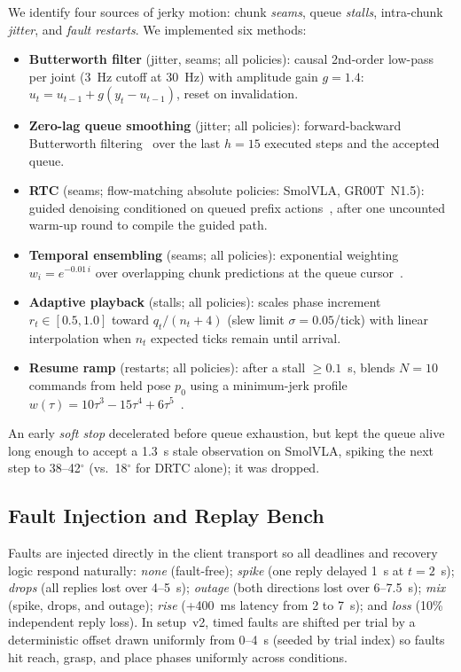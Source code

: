 \documentclass[conference]{IEEEtran}
\newcommand{\drtc}{DRTC}
\newcommand{\smolvla}{SmolVLA}
\newcommand{\groot}{GR00T~N1.5}
\begin{document}
We identify four sources of jerky motion: chunk \emph{seams}, queue \emph{stalls}, intra-chunk \emph{jitter}, and \emph{fault restarts}. We implemented six methods:
\begin{itemize}
  \item \textbf{Butterworth filter} (jitter, seams; all policies): causal 2nd-order low-pass per joint (3~Hz cutoff at 30~Hz) with amplitude gain $g=1.4$: $u_t = u_{t-1} + g(y_t - u_{t-1})$, reset on invalidation.
  \item \textbf{Zero-lag queue smoothing} (jitter; all policies): forward-backward Butterworth filtering~\cite{gustafsson1996} over the last $h=15$ executed steps and the accepted queue.
  \item \textbf{RTC} (seams; flow-matching absolute policies: \smolvla{}, \groot{}): guided denoising conditioned on queued prefix actions~\cite{black2025rtc}, after one uncounted warm-up round to compile the guided path.
  \item \textbf{Temporal ensembling} (seams; all policies): exponential weighting $w_i = e^{-0.01\,i}$ over overlapping chunk predictions at the queue cursor~\cite{zhao2023act}.
  \item \textbf{Adaptive playback} (stalls; all policies): scales phase increment $r_t \in [0.5,1.0]$ toward $q_t/(n_t+4)$ (slew limit $\sigma=0.05$/tick) with linear interpolation when $n_t$ expected ticks remain until arrival.
  \item \textbf{Resume ramp} (restarts; all policies): after a stall $\ge 0.1$~s, blends $N=10$ commands from held pose $p_0$ using a minimum-jerk profile $w(\tau)=10\tau^3-15\tau^4+6\tau^5$~\cite{flash1985}.
\end{itemize}
An early \emph{soft stop} decelerated before queue exhaustion, but kept the queue alive long enough to accept a 1.3~s stale observation on \smolvla{}, spiking the next step to 38--42$^\circ$ (vs.\ 18$^\circ$ for \drtc{} alone); it was dropped.

\subsection{Fault Injection and Replay Bench}

Faults are injected directly in the client transport so all deadlines and recovery logic respond naturally: \emph{none} (fault-free); \emph{spike} (one reply delayed 1~s at $t=2$~s); \emph{drops} (all replies lost over 4--5~s); \emph{outage} (both directions lost over 6--7.5~s); \emph{mix} (spike, drops, and outage); \emph{rise} (+400~ms latency from 2 to 7~s); and \emph{loss} (10\% independent reply loss). In setup~v2, timed faults are shifted per trial by a deterministic offset drawn uniformly from 0--4~s (seeded by trial index) so faults hit reach, grasp, and place phases uniformly across conditions.
\end{document}
